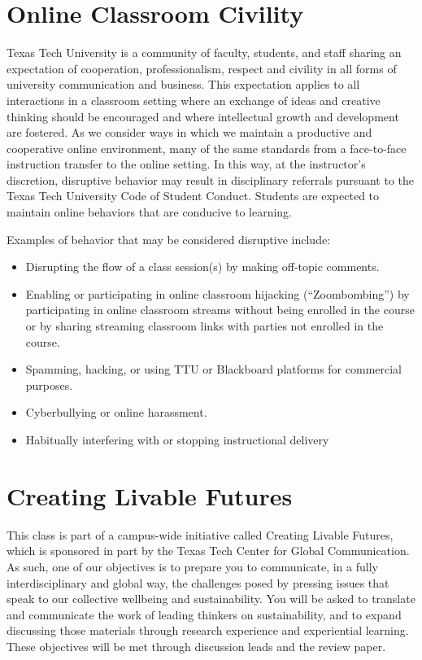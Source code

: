 \documentclass[12pt, notitlepage]{article}   	%
\begin{document}
{\section{Online Classroom Civility}
Texas Tech University is a community of faculty, students, and staff sharing an 
expectation of cooperation, professionalism, respect and civility in all forms of 
university communication and business. This expectation applies to all interactions in a 
classroom setting where an exchange of ideas and creative thinking should be encouraged 
and where intellectual growth and development are fostered. As we consider ways in which 
we maintain a productive and cooperative online environment, many of the same standards 
from a face-to-face instruction transfer to the online setting. In this way, at the 
instructor’s discretion, disruptive behavior may result in disciplinary referrals pursuant 
to the Texas Tech University Code of Student Conduct. Students are expected to maintain 
online behaviors that are conducive to learning.

Examples of behavior that may be considered disruptive include:
\begin{itemize}
	\item{Disrupting the flow of a class session(s) by making off-topic comments.}
	\item{Enabling or participating in online classroom hijacking (“Zoombombing”) by 
	participating in online classroom streams without being enrolled in the course or 
	by sharing streaming classroom links with parties not enrolled in the course.}
	\item{Spamming, hacking, or using TTU or Blackboard platforms for commercial purposes.}
	\item{Cyberbullying or online harassment.}
	\item{Habitually interfering with or stopping instructional delivery}
\end{itemize}

\section{Creating Livable Futures}
This class is part of a campus-wide initiative called Creating Livable Futures, 
which is sponsored in part by the Texas Tech Center for Global Communication. 
As such, one of our objectives is to prepare you to communicate, 
in a fully interdisciplinary and global way, the challenges posed by pressing issues 
that speak to our collective wellbeing and sustainability. You will be asked to translate 
and communicate the work of leading thinkers on sustainability, and to expand discussing 
those materials through research experience and experiential learning.
These objectives will be met through discussion leads and the review paper. 

}
\end{document}

